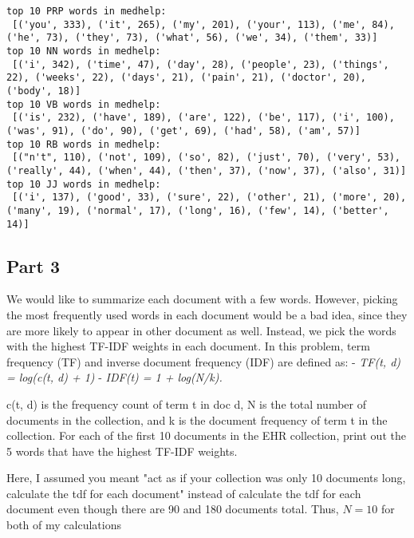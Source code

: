 \documentclass[11pt]{article}
\begin{document}
    \begin{Verbatim}[commandchars=\\\{\}]
top 10 PRP words in medhelp: 
 [('you', 333), ('it', 265), ('my', 201), ('your', 113), ('me', 84), ('he', 73), ('they', 73), ('what', 56), ('we', 34), ('them', 33)]
top 10 NN words in medhelp: 
 [('i', 342), ('time', 47), ('day', 28), ('people', 23), ('things', 22), ('weeks', 22), ('days', 21), ('pain', 21), ('doctor', 20), ('body', 18)]
top 10 VB words in medhelp: 
 [('is', 232), ('have', 189), ('are', 122), ('be', 117), ('i', 100), ('was', 91), ('do', 90), ('get', 69), ('had', 58), ('am', 57)]
top 10 RB words in medhelp: 
 [("n't", 110), ('not', 109), ('so', 82), ('just', 70), ('very', 53), ('really', 44), ('when', 44), ('then', 37), ('now', 37), ('also', 31)]
top 10 JJ words in medhelp: 
 [('i', 137), ('good', 33), ('sure', 22), ('other', 21), ('more', 20), ('many', 19), ('normal', 17), ('long', 16), ('few', 14), ('better', 14)]

    \end{Verbatim}

    \subsection{Part 3}\label{part-3}

We would like to summarize each document with a few words. However,
picking the most frequently used words in each document would be a bad
idea, since they are more likely to appear in other document as well.
Instead, we pick the words with the highest TF-IDF weights in each
document. In this problem, term frequency (TF) and inverse document
frequency (IDF) are defined as: - \emph{TF(t, d) = log(c(t, d) + 1)} -
\emph{IDF(t) = 1 + log(N/k).}

c(t, d) is the frequency count of term t in doc d, N is the total number
of documents in the collection, and k is the document frequency of term
t in the collection. For each of the first 10 documents in the EHR
collection, print out the 5 words that have the highest TF-IDF weights.

    Here, I assumed you meant "act as if your collection was only 10
documents long, calculate the tdf for each document" instead of
calculate the tdf for each document even though there are 90 and 180
documents total. Thus, \(N=10\) for both of my calculations
\end{document}
